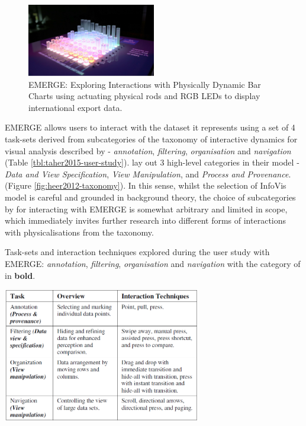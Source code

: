 \documentclass[11pt]{article}
\begin{document}
\begin{figure}[H]
\centering
\includegraphics[width=0.5\textwidth]{img/taher2015-emerge.png} 
\caption{EMERGE: Exploring Interactions with Physically Dynamic Bar Charts using actuating physical rods and RGB LEDs to display international export data.}\label{fig:taher2015-emerge}
\end{figure}

EMERGE allows users to interact with the dataset it represents using a set of 4 task-sets derived from subcategories of the taxonomy of interactive dynamics for visual analysis described by \citet{heer2012} - \textit{annotation}, \textit{filtering}, \textit{organisation} and \textit{navigation} (Table \ref{tbl:taher2015-user-study}).  \citeauthor{heer2012} lay out 3 high-level categories in their model - \textit{Data and View Specification}, \textit{View Manipulation}, and \textit{Process and Provenance}. (Figure \ref{fig:heer2012-taxonomy}). In this sense, whilst the selection of InfoVis model is careful and grounded in background theory, the choice of subcategories by \citeauthor{taher2015} for interacting with EMERGE is somewhat arbitrary and limited in scope, which immediately invites further research into different forms of interactions with physicalisations from the taxonomy.

\begin{table}[H]
\centering
\caption{Task-sets and interaction techniques explored during the user study with EMERGE: \textit{annotation}, \textit{filtering}, \textit{organisation} and \textit{navigation} with the category of \protect\citet{heer2012} in \textbf{bold}.}\label{tbl:taher2015-user-study}
\includegraphics[width=0.65\textwidth]{img/taher2015-user-study.png} 
\end{table}
\end{document}
